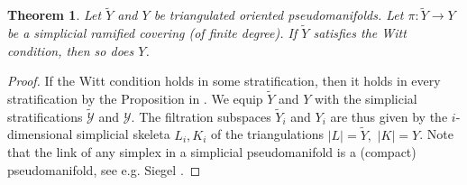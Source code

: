 \documentclass{amsart}
\newtheorem{thm}{Theorem}[section]
\theoremstyle{definition}
\theoremstyle{remark}
\newcommand {\Ya}    {\ensuremath{\mathcal{Y}}}
\newcommand {\wY}    {{\ensuremath{\widetilde{Y}}}}
\begin{document}
\begin{thm} \label{thm.baseoframifiedcoveriswitt}
Let $\wY$ and $Y$ be triangulated oriented pseudomanifolds.
Let $\pi: \wY \to Y$ be a simplicial ramified covering (of finite degree).
If $\wY$ satisfies the Witt condition, then so does $Y$.
\end{thm}
\begin{proof}
If the Witt condition holds in some stratification, then it
holds in every stratification by the Proposition in
\cite[Section 2.4]{gmih2}.
We equip $\wY$ and $Y$ with the simplicial
stratifications $\widetilde{\Ya}$ and $\Ya$. The filtration
subspaces $\wY_i$ and $Y_i$ are thus given by the $i$-dimensional
simplicial skeleta $L_i, K_i$ of the triangulations
$|L| = \wY,$ $|K| = Y$.
Note that the link of any simplex in a simplicial pseudomanifold
is a (compact) pseudomanifold,
see e.g. Siegel \cite[p. 1070, I.2]{siegel}.


\end{proof}
\end{document}
